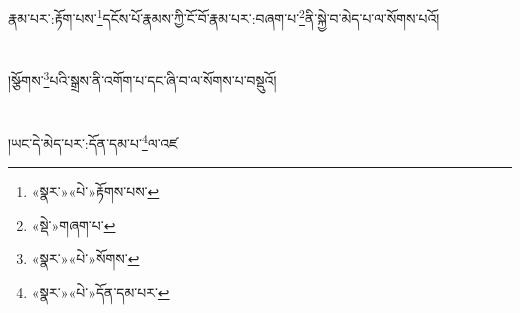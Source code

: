 { }རྣམ་པར་:རྟོག་པས་\footnote{«སྣར་»«པེ་»རྟོགས་པས་}དངོས་པོ་རྣམས་ཀྱི་ངོ་བོ་རྣམ་པར་:བཞག་པ་\footnote{«སྡེ་»གཞག་པ་}ནི་སྐྱེ་བ་མེད་པ་ལ་སོགས་པའོ།\chapter{ }།སྩོགས་\footnote{«སྣར་»«པེ་»སོགས་}པའི་སྒྲས་ནི་འགོག་པ་དང་ཞི་བ་ལ་སོགས་པ་བསྡུའོ།\chapter{ }།ཡང་དེ་མེད་པར་:དོན་དམ་པ་\footnote{«སྣར་»«པེ་»དོན་དམ་པར་}ལ་འཛ